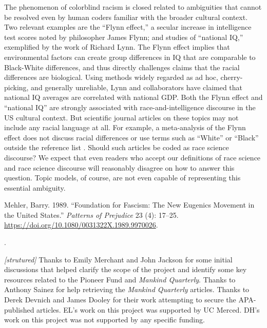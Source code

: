 \documentclass[12pt]{article}
\newlength{\cslhangindent}
\newenvironment{CSLReferences}[2] %
 {%
  \setlength{\parindent}{0pt}
  \ifodd #1 \everypar{\setlength{\hangindent}{\cslhangindent}}\ignorespaces\fi
  \ifnum #2 > 0
  \setlength{\parskip}{#2\baselineskip}
  \fi
 }%
 {}
\newcounter{lastnote}
\newenvironment{scilastnote}{%
\setcounter{lastnote}{\value{enumiv}}%
\addtocounter{lastnote}{+1}%
\begin{list}%
{\arabic{lastnote}.}
{\setlength{\leftmargin}{.22in}}
{\setlength{\labelsep}{.5em}}}
{\end{list}}
\begin{document}
The phenomenon of colorblind racism is closed related to ambiguities that cannot be resolved even by human coders familiar with the broader cultural context. Two relevant examples are the ``Flynn effect,'' a secular increase in intelligence test scores noted by philosopher James Flynn; and studies of ``national IQ,'' exemplified by the work of Richard Lynn. The Flynn effect implies that environmental factors can create group differences in IQ that are comparable to Black-White differences, and thus directly challenges claims that the racial differences are biological. Using methods widely regarded as ad hoc, cherry-picking, and generally unreliable, Lynn and collaborators have claimed that national IQ averages are correlated with national GDP. Both the Flynn effect and ``national IQ'' are strongly associated with race-and-intelligence discourse in the US cultural context. But scientific journal articles on these topics may not include any racial language at all. For example, a meta-analysis of the Flynn effect does not discuss racial differences or use terms such as ``White'' or ``Black'' outside the reference list \cite{TrahanFlynnEffectMetaanalysis2014}. Should such articles be coded as race science discourse? We expect that even readers who accept our definitions of race science and race science discourse will reasonably disagree on how to answer this question. Topic models, of course, are not even capable of representing this essential ambiguity.

\clearpage

\hypertarget{refs}{}
\begin{CSLReferences}{1}{0}
\leavevmode{}%
Mehler, Barry. 1989. {``Foundation for Fascism: {The} New Eugenics Movement in the {United States}.''} \emph{Patterns of Prejudice} 23 (4): 17--25. \url{https://doi.org/10.1080/0031322X.1989.9970026}.

\end{CSLReferences}





\begin{scilastnote}
\item \emph{{[}strutured{]}} Thanks to Emily Merchant and John Jackson for some initial discussions that helped clarify the scope of the project and identify some key resources related to the Pioneer Fund and \emph{Mankind Quarterly}. Thanks to Anthony Sainez for help retrieving the \emph{Mankind Quarterly} articles. Thanks to Derek Devnich and James Dooley for their work attempting to secure the APA-published articles. EL's work on this project was supported by UC Merced. DH's work on this project was not supported by any specific funding.
\end{scilastnote}
\end{document}

